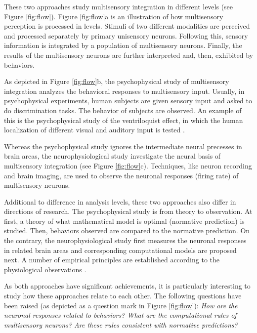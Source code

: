 \documentclass{article}[11pt]
\begin{document}
These two approaches study multisensory integration in different levels (see Figure \ref{fig:flow}).
Figure \ref{fig:flow}a is an illustration of how multisensory perception is processed in levels. Stimuli of two different modalities are perceived and processed separately by primary unisensory neurons. Following this, sensory information is integrated by a population of multisensory neurons. Finally, the results of the multisensory neurons are further interpreted and, then, exhibited by behaviors.

As depicted in Figure \ref{fig:flow}b, the psychophysical study of multisensory integration analyzes the behavioral responses to multisensory input. Usually, in psychophysical experiments, human subjects are given sensory input and asked to do discrimination tasks. The behavior of subjects are observed. An example of this is the psychophysical study of the ventriloquist effect, in which the human localization of different visual and auditory input is tested \cite{alais_ventriloquist_2004}.

Whereas the psychophysical study ignores the intermediate neural precesses in brain areas, the neurophysiological study investigate the neural basis of multisensory integration (see Figure \ref{fig:flow}c). Techniques, like neuron recording and brain imaging, are used to observe the neuronal responses (firing rate) of multisensory neurons.

Additional to difference in analysis levels, these two approaches also differ in directions of research. The psychophysical study is from theory to observation. At first, a theory of what mathematical model is optimal (normative prediction) is studied. Then, behaviors observed are compared to the normative prediction. On the contrary, the neurophysiological study first measures the neuronal responses in related brain areas and corresponding computational models are proposed next. A number of empirical principles are established according to the physiological observations \cite{stein_merging_1993, stanford_evaluating_2005}.

As both approaches have significant achievements, it is particularly interesting to study how these approaches relate to each other. The following questions have been raised (as depicted as a question mark in Figure \ref{fig:flow}): \emph{How are the neuronal responses related to behaviors? What are the computational rules of multisensory neurons? Are these rules consistent with normative predictions?} 
\end{document}
